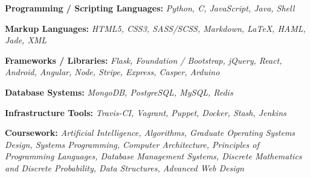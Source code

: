 \documentclass[12pt,a4paper,sans]{moderncv} %
\begin{document}
\begin{itemize}

\item{\textbf{Programming / Scripting Languages:} \textit{Python, C, JavaScript, Java, Shell}

\small{}}

\vspace{6pt}

\item{\textbf{Markup Languages:}\textit{ HTML5, CSS3, SASS/SCSS, Markdown, LaTeX, HAML, Jade, XML }

\vspace{3pt}

\small{}}

\vspace{6pt}

\item{\textbf{Frameworks / Libraries:}\textit{ Flask, Foundation / Bootstrap, jQuery, React, Android, Angular, Node, Stripe, Express, Casper, Arduino}

\vspace{3pt}

\item{\textbf{Database Systems:}\textit{ MongoDB, PostgreSQL, MySQL, Redis} }

\vspace{3pt}

\small{}}

\vspace{6pt}

\item{\textbf{Infrastructure Tools:}\textit{ Travis-CI, Vagrant, Puppet, Docker, Stash, Jenkins }

\vspace{3pt}

\small{}}

\vspace{6pt}

\item{\textbf{Coursework:}\textit{ Artificial Intelligence, Algorithms, Graduate Operating Systems Design, Systems Programming, Computer Architecture, Principles of Programming Languages, Database Management Systems, Discrete Mathematics and Discrete Probability, Data Structures, Advanced Web Design} }

\vspace{3pt}

\small{}

\vspace{6pt}

\end{itemize}
\end{document}
